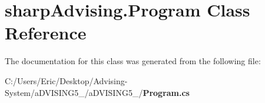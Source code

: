 \section{sharp\+Advising.\+Program Class Reference}
\label{classsharp_advising_1_1_program}


The documentation for this class was generated from the following file\+:\begin{DoxyCompactItemize}
\item 
C\+:/\+Users/\+Eric/\+Desktop/\+Advising-\/\+System/a\+D\+V\+I\+S\+I\+N\+G5\+\_/a\+D\+V\+I\+S\+I\+N\+G5\+\_/{\bf Program.\+cs}\end{DoxyCompactItemize}
